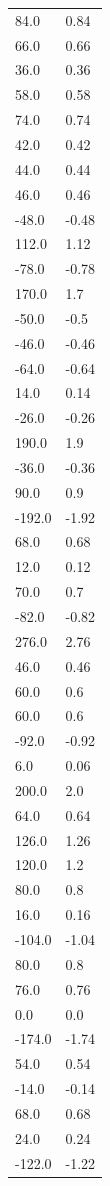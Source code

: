 \begin{longtable}{ll}
84.0 & 0.84 \\
66.0 & 0.66 \\
36.0 & 0.36 \\
58.0 & 0.58 \\
74.0 & 0.74 \\
42.0 & 0.42 \\
44.0 & 0.44 \\
46.0 & 0.46 \\
-48.0 & -0.48 \\
112.0 & 1.12 \\
-78.0 & -0.78 \\
170.0 & 1.7 \\
-50.0 & -0.5 \\
-46.0 & -0.46 \\
-64.0 & -0.64 \\
14.0 & 0.14 \\
-26.0 & -0.26 \\
190.0 & 1.9 \\
-36.0 & -0.36 \\
90.0 & 0.9 \\
-192.0 & -1.92 \\
68.0 & 0.68 \\
12.0 & 0.12 \\
70.0 & 0.7 \\
-82.0 & -0.82 \\
276.0 & 2.76 \\
46.0 & 0.46 \\
60.0 & 0.6 \\
60.0 & 0.6 \\
-92.0 & -0.92 \\
6.0 & 0.06 \\
200.0 & 2.0 \\
64.0 & 0.64 \\
126.0 & 1.26 \\
120.0 & 1.2 \\
80.0 & 0.8 \\
16.0 & 0.16 \\
-104.0 & -1.04 \\
80.0 & 0.8 \\
76.0 & 0.76 \\
0.0 & 0.0 \\
-174.0 & -1.74 \\
54.0 & 0.54 \\
-14.0 & -0.14 \\
68.0 & 0.68 \\
24.0 & 0.24 \\
-122.0 & -1.22 \\

\end{longtable}
